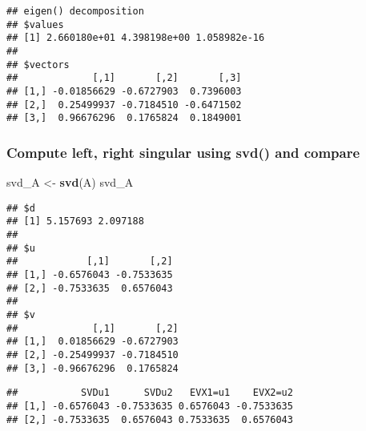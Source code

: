 \documentclass[]{article}
\newenvironment{Shaded}{\begin{snugshade}}{\end{snugshade}}
\newcommand{\CommentTok}[1]{\textcolor[rgb]{0.56,0.35,0.01}{\textit{#1}}}
\newcommand{\KeywordTok}[1]{\textcolor[rgb]{0.13,0.29,0.53}{\textbf{#1}}}
\newcommand{\NormalTok}[1]{#1}
\newcommand{\OperatorTok}[1]{\textcolor[rgb]{0.81,0.36,0.00}{\textbf{#1}}}
\newcommand{\StringTok}[1]{\textcolor[rgb]{0.31,0.60,0.02}{#1}}
\begin{document}
\begin{verbatim}
## eigen() decomposition
## $values
## [1] 2.660180e+01 4.398198e+00 1.058982e-16
## 
## $vectors
##             [,1]       [,2]       [,3]
## [1,] -0.01856629 -0.6727903  0.7396003
## [2,]  0.25499937 -0.7184510 -0.6471502
## [3,]  0.96676296  0.1765824  0.1849001
\end{verbatim}

\hypertarget{compute-left-right-singular-using-svd-and-compare}{%
\subsubsection{Compute left, right singular using svd() and
compare}\label{compute-left-right-singular-using-svd-and-compare}}

\begin{Shaded}
\begin{Highlighting}[]
\NormalTok{svd_A <-}\StringTok{ }\KeywordTok{svd}\NormalTok{(A)}
\NormalTok{svd_A}
\end{Highlighting}
\end{Shaded}

\begin{verbatim}
## $d
## [1] 5.157693 2.097188
## 
## $u
##            [,1]       [,2]
## [1,] -0.6576043 -0.7533635
## [2,] -0.7533635  0.6576043
## 
## $v
##             [,1]       [,2]
## [1,]  0.01856629 -0.6727903
## [2,] -0.25499937 -0.7184510
## [3,] -0.96676296  0.1765824
\end{verbatim}

\begin{Shaded}
\end{Shaded}

\begin{verbatim}
##           SVDu1      SVDu2   EVX1=u1    EVX2=u2
## [1,] -0.6576043 -0.7533635 0.6576043 -0.7533635
## [2,] -0.7533635  0.6576043 0.7533635  0.6576043
\end{verbatim}
\end{document}

